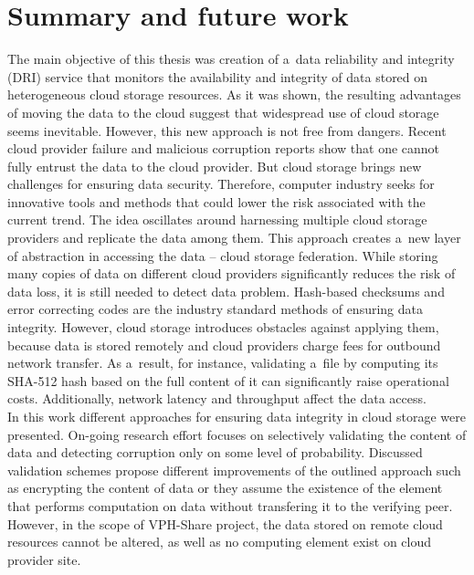 \chapter{Summary and future work}
\label{cha:conclusions}

The main objective of this thesis was creation of a~data reliability
and integrity (DRI) service that monitors the availability and integrity
of data stored on heterogeneous cloud storage resources. As it was shown,
the resulting advantages of moving the data to the cloud suggest that widespread
use of cloud storage seems inevitable. However, this new approach is not free
from dangers. Recent cloud provider failure and malicious corruption reports
\cite{amazon-downtime1, amazon-downtime2, gmail-downtime, docs-downtime} 
show that
one cannot fully entrust the data to the cloud provider. But cloud storage brings
new challenges for ensuring data security. Therefore, computer industry seeks for
innovative tools and methods that could lower the risk associated with the current
trend. The idea oscillates around harnessing multiple cloud storage providers
and replicate the data among them. This approach creates a~new layer of abstraction
in accessing the data -- cloud storage federation. While storing many copies of 
data on different cloud providers significantly reduces the risk of data loss, it
is still needed to detect data problem. Hash-based checksums and error correcting codes
are the industry standard methods of ensuring data integrity. However, cloud storage
introduces obstacles against applying them, because data is stored remotely and cloud
providers charge fees for outbound network transfer. As a~result, for instance, 
validating a~file by computing its SHA-512 hash based on the full content of it can
significantly raise operational costs. Additionally, network latency and throughput
affect the data access.\\

In this work different approaches for ensuring data integrity in cloud storage were
presented. On-going research effort focuses on selectively validating the content of
data and detecting corruption only on some level of probability. Discussed validation
schemes propose different improvements of the outlined approach such as encrypting
the content of data or they assume the existence of the element that performs computation
on data without transfering it to the verifying peer. However, in the scope of VPH-Share
project, the data stored on remote cloud resources cannot be altered, as well as no
computing element exist on cloud provider site.\\

